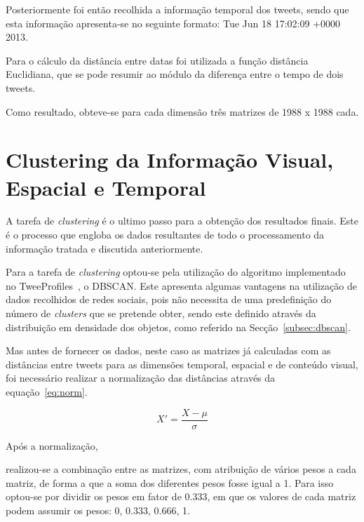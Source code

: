 Posteriormente foi então recolhida a informação temporal dos tweets, sendo que esta informação apresenta-se no seguinte formato: Tue Jun 18 17:02:09 +0000 2013. 

Para o cálculo da distância entre datas foi utilizada a função distância Euclidiana, que se pode resumir ao módulo da diferença entre o tempo de dois tweets.

Como resultado, obteve-se para cada dimensão três matrizes de 1988 x 1988 cada.


\section{Clustering da Informação Visual, Espacial e Temporal} \label{sec:finalclustering}

A tarefa de \textit{clustering} é o ultimo passo para a obtenção dos resultados finais. Este é o processo que engloba os dados resultantes de todo o processamento da informação tratada e discutida anteriormente.

Para a tarefa de \textit{clustering} optou-se pela utilização do algoritmo implementado no TweeProfiles~\cite{Cunha2013}, o DBSCAN. Este apresenta algumas vantagens na utilização de dados recolhidos de redes sociais, pois não necessita de uma predefinição do número de \textit{clusters} que se pretende obter, sendo este definido através da distribuição em densidade dos objetos, como referido na Secção~\ref{subsec:dbscan}.

Mas antes de fornecer os dados, neste caso as matrizes já calculadas com as distâncias entre tweets para as dimensões temporal, espacial e de conteúdo visual, foi necessário realizar a normalização das distâncias através da equação~\ref{eq:norm}.

\begin{equation}
X' = \frac{X - \mu }{\sigma }
\label{eq:norm}
\end{equation}

Após a normalização, 

realizou-se a combinação entre as matrizes, com atribuição de vários pesos a cada matriz, de forma a que a soma dos diferentes pesos fosse igual a 1. Para isso optou-se por dividir os pesos em fator de 0.333, em que os valores de cada matriz podem assumir os pesos: 0, 0.333, 0.666, 1.

